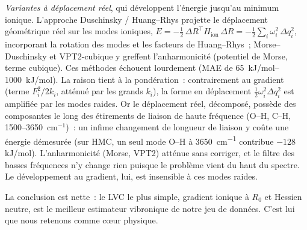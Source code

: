 \emph{Variantes à déplacement réel}, qui développent l'énergie jusqu'au minimum ionique. L'approche Duschinsky / Huang--Rhys\cite{duschinsky1937,huang1950} projette le déplacement géométrique réel sur les modes ioniques, $E = -\tfrac12\,\Delta R^\top H_{\text{ion}}\,\Delta R = -\tfrac12\sum_i \omega_i^2\,\Delta q_i^2$, incorporant la rotation des modes et les facteurs de Huang--Rhys~; Morse--Duschinsky et VPT2-cubique y greffent l'anharmonicité (potentiel de Morse\cite{morse1929}, terme cubique\cite{barone2005}). Ces méthodes échouent lourdement (MAE de \SIrange{65}{1000}{kJ/mol}). La raison tient à la pondération~: contrairement au gradient (terme $F_i^2/2k_i$, atténué par les grands $k_i$), la forme en déplacement $\tfrac12\omega_i^2\Delta q_i^2$ est amplifiée par les modes raides. Or le déplacement réel, décomposé, possède des composantes le long des étirements de liaison de haute fréquence (O–H, C–H, 1500--3650~cm$^{-1}$)~: un infime changement de longueur de liaison y coûte une énergie démesurée (sur HMC, un seul mode O–H à \SI{3650}{cm^{-1}} contribue $-128$\,kJ/mol). L'anharmonicité (Morse, VPT2) atténue sans corriger, et le filtre des basses fréquences n'y change rien puisque le problème vient du haut du spectre. Le développement au gradient, lui, est insensible à ces modes raides.

La conclusion est nette~: le LVC le plus simple, gradient ionique à $R_0$ et Hessien neutre, est le meilleur estimateur vibronique de notre jeu de données. C'est lui que nous retenons comme cœur physique.

